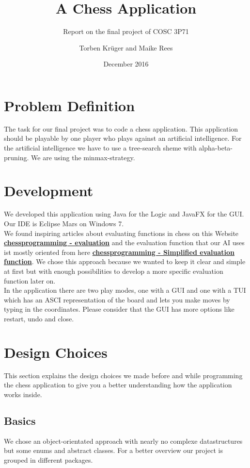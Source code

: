\documentclass[final, paper=a4, paper=portrait, pagesize=auto, fontsize=10pt,english]{scrartcl}
\begin{document}
\title{A Chess Application}
\subtitle{Report on the final project of COSC 3P71}
\date{December 2016}
\author{Torben Krüger and Maike Rees}
\maketitle

\newpage
 
\section{Problem Definition}
The task for our final project was to code a chess application. This application should be playable by one player who plays against an artificial intelligence. For the artificial intelligence we have to use a tree-search sheme with alpha-beta-pruning. We are using the minmax-strategy.

\section{Development}
We developed this application using Java for the Logic and JavaFX for the GUI. Our IDE is Eclipse Mars on Windows 7. \\

We found inspiring articles about evaluating functions in chess on this Website 
\href{http://chessprogramming.wikispaces.com/Evaluation}{\textbf{chessprogramming - evaluation}}  and the evaluation function that our AI uses ist mostly oriented from here
\href{https://chessprogramming.wikispaces.com/Simplified+evaluation+function}{\textbf{chessprogramming - Simplified evaluation function}}. We chose this approach because we wanted to keep it clear and simple at first but with enough possibilities to develop a more specific evaluation function later on. \\

In the application there are two play modes, one with a GUI and one with a TUI which has an ASCI representation of the board and lets you make moves by typing in the coordinates. Please consider that the GUI has  more options like restart, undo and close.

\section{Design Choices}
This section explains the design choices we made before and while programming the chess application to give you a better understanding how the application works inside.
\subsection{Basics}
We chose an object-orientated approach with nearly no complexe datastructures but some enums and abstract classes. For a better overview our project is grouped in different packages.
\end{document}
